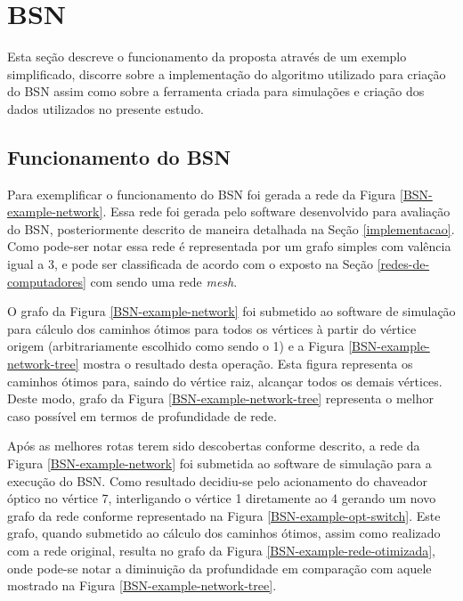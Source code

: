 \section{BSN}
Esta seção descreve o funcionamento da proposta através de um exemplo simplificado, discorre sobre a implementação do algoritmo utilizado para criação do BSN assim como sobre a ferramenta criada para simulações e criação dos dados utilizados no presente estudo.

\subsection{Funcionamento do BSN}
Para exemplificar o funcionamento do BSN foi gerada a rede da Figura \ref{BSN-example-network}. Essa rede foi gerada pelo software desenvolvido para avaliação do BSN, posteriormente descrito de maneira detalhada na Seção \ref{implementacao}. Como pode-ser notar essa rede é representada por um grafo simples com valência igual a 3, e pode ser classificada de acordo com o exposto na Seção \ref{redes-de-computadores} com sendo uma rede \emph{mesh}. 

O grafo da Figura \ref{BSN-example-network} foi submetido ao software de simulação para cálculo dos caminhos ótimos para todos os vértices à partir do vértice origem (arbitrariamente escolhido como sendo o 1) e a Figura \ref{BSN-example-network-tree} mostra o resultado desta operação. Esta figura representa os caminhos ótimos para, saindo do vértice raiz, alcançar todos os demais vértices. Deste modo, grafo da Figura \ref{BSN-example-network-tree} representa o melhor caso possível em termos de profundidade de rede.

Após as melhores rotas terem sido descobertas conforme descrito, a rede da Figura \ref{BSN-example-network} foi submetida ao software de simulação para a execução do BSN. Como resultado decidiu-se pelo acionamento do chaveador óptico no vértice 7, interligando o vértice 1 diretamente ao 4 gerando um novo grafo da rede conforme representado na Figura \ref{BSN-example-opt-switch}. Este grafo, quando submetido ao cálculo dos caminhos ótimos, assim como realizado com a rede original, resulta no grafo da Figura \ref{BSN-example-rede-otimizada}, onde pode-se notar a diminuição da profundidade em comparação com aquele mostrado na Figura \ref{BSN-example-network-tree}.

